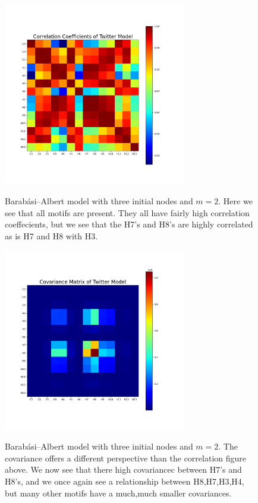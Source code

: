 \begin{figure}
    \includegraphics[width=8cm]{Images/CorrCoefPreferentialAttachmentModel2.png}\
    \centering
    \caption{Barabási–Albert model with three initial nodes and $m=2$. Here we see that all motifs 
    are present. They all have fairly high correlation coeffecients, but we see that the H7's and
    H8's are highly correlated as is H7 and H8 with H3.}
\end{figure}

\begin{figure}
    \includegraphics[width=08cm]{Images/CovMatPreferentialAttachmentModel2.png}\
    \centering
    \caption{Barabási–Albert model with three initial nodes and $m=2$. The covariance
    offers a different perspective than the correlation figure above. We now see that 
    there high covariancec between H7's and H8's, and we once again see a relationship
    between H8,H7,H3,H4, but many other motifs have a much,much smaller covariances.}
\end{figure}

